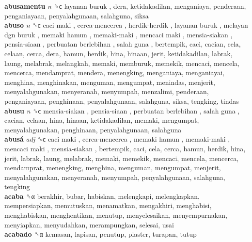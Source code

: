 \textbf{abusamentu} \emph{n}  ␝ϲ   layanan buruk , dera, ketidakadilan, menganiaya, penderaan, penganiayaan, penyalahgunaan, salahguna, siksa  \\
\textbf{abuso} \emph{n}  ␝ϲ   caci maki ,  cerca-mencerca ,  herdik-herdik ,  layanan buruk ,  melayan dgn buruk ,  memaki hamun ,  memaki-maki ,  mencaci maki ,  mensia-siakan ,  pensia-siaan ,  perbuatan berlebihan ,  salah guna , bertempik, caci, cacian, cela, celaan, cerca, dera, hamun, herdik, hina, hinaan, jerit, ketidakadilan, labrak, laung, melabrak, melangkah, memaki, memburuk, memekik, mencaci, mencela, mencerca, mendamprat, mendera, menengking, menganiaya, menganiayai, menghina, menghinakan, menguman, mengumpat, menindas, menjerit, menyalahgunakan, menyeranah, menyumpah, menzalimi, penderaan, penganiayaan, penghinaan, penyalahgunaan, salahguna, siksa, tengking, tindas  \\
\textbf{abusu} \emph{n}  ␝ϲ   mensia-siakan ,  pensia-siaan ,  perbuatan berlebihan ,  salah guna , cacian, celaan, hina, hinaan, ketidakadilan, memaki, mengumpat, menyalahgunakan, penghinaan, penyalahgunaan, salahguna  \\
\textbf{abusá} \emph{adj}  ␝ϲ   caci maki ,  cerca-mencerca ,  memaki hamun ,  memaki-maki ,  mencaci maki ,  mensia-siakan , bertempik, caci, cela, cerca, hamun, herdik, hina, jerit, labrak, laung, melabrak, memaki, memekik, mencaci, mencela, mencerca, mendamprat, menengking, menghina, menguman, mengumpat, menjerit, menyalahgunakan, menyeranah, menyumpah, penyalahgunaan, salahguna, tengking  \\
\textbf{acaba} ␝α  berakhir, bubar, habiskan, melengkapi, melengkapkan, mempersiapkan, memutuskan, menamatkan, mengakhiri, menghabisi, menghabiskan, menghentikan, menutup, menyelesaikan, menyempurnakan, menyiapkan, menyudahkan, merampungkan, selesai, usai  \\
\textbf{acabado} ␝α  kemasan, lapisan, penutup, plaster, turapan, tutup  \\
